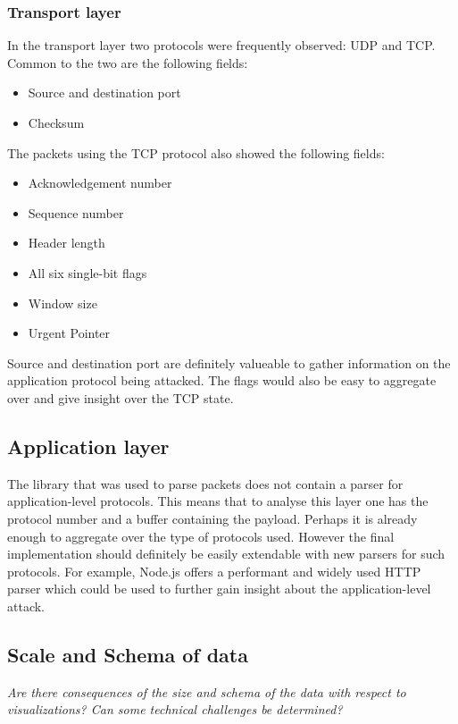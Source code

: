      \subsubsection{Transport layer}
In the transport layer two protocols were frequently observed: UDP and TCP.
Common to the two are the following fields:
\begin{itemize}
    \item Source and destination port
    \item Checksum
\end{itemize}
The packets using the TCP protocol also showed the following fields:
\begin{itemize}
    \item Acknowledgement number
    \item Sequence number
    \item Header length
    \item All six single-bit flags
    \item Window size
    \item Urgent Pointer
\end{itemize}
Source and destination port are definitely valueable to gather information on the application protocol being attacked. The flags would also be easy to aggregate over and give insight over the TCP state.

\subsection{Application layer}
The library that was used to parse packets does not contain a parser for application-level protocols. This means that to analyse this layer one has the protocol number and a buffer containing the payload. Perhaps it is already enough to aggregate over the type of protocols used. However the final implementation should definitely be easily extendable with new parsers for such protocols. For example, Node.js offers a performant and widely used HTTP parser which could be used to further gain insight about the application-level attack.
     
    \subsection{Scale and Schema of data}\label{scaleandschema}
\textit{    Are there consequences of the size and schema of the data with respect to visualizations? Can some technical challenges be determined?
}

